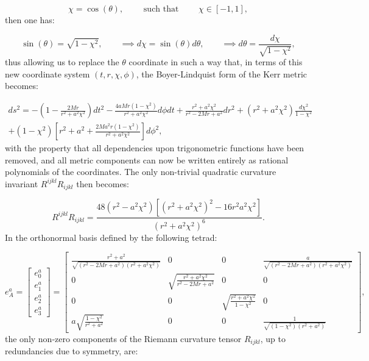 \documentclass{article}
\begin{document}
\begin{equation}
\chi = \cos \left( \theta \right), \qquad \text{ such that } \qquad \chi \in \left[ -1, 1 \right],
\end{equation}
then one has:

\begin{equation}
\sin \left( \theta \right) = \sqrt{1 - \chi^2}, \qquad \implies d \chi = \sin \left( \theta \right) d \theta, \qquad \implies d \theta = \frac{d \chi}{\sqrt{1 - \chi^2}},
\end{equation}
thus allowing us to replace the ${\theta}$ coordinate in such a way that, in terms of this new coordinate system ${\left( t, r, \chi, \phi \right)}$, the Boyer-Lindquist form of the Kerr metric becomes:

\begin{multline}
ds^2 = - \left( 1 - \frac{2 M r}{r^2 + a^2 \chi^2} \right) dt^2 - \frac{4 a M r \left( 1 - \chi^2 \right)}{r^2 + a^2 \chi^2} d \phi dt + \frac{r^2 + a^2 \chi^2}{r^2 - 2 M r + a^2} dr^2 + \left( r^2 + a^2 \chi^2 \right) \frac{d \chi^2}{1 - \chi^2}\\
+ \left( 1 - \chi^2 \right) \left[ r^2 + a^2 + \frac{2 M a^2 r \left( 1 - \chi^2 \right)}{r^2 + a^2 \chi^2} \right] d \phi^2,
\end{multline}
with the property that all dependencies upon trigonometric functions have been removed, and all metric components can now be written entirely as rational polynomials of the coordinates. The only non-trivial quadratic curvature invariant ${R^{i j k l} R_{i j k l}}$ then becomes:

\begin{equation}
R^{i j k l} R_{i j k l} = \frac{48 \left( r^2 - a^2 \chi^2 \right) \left[ \left( r^2 + a^2 \chi^2 \right)^2 - 16 r^2 a^2 \chi^2 \right]}{\left( r^2 + a^2 \chi^2 \right)^6}.
\end{equation}
In the orthonormal basis defined by the following tetrad:

\begin{equation}
e_{A}^{a} = \begin{bmatrix}
e_{0}^{a}\\
e_{1}^{a}\\
e_{2}^{a}\\
e_{3}^{a}
\end{bmatrix} = \begin{bmatrix}
\frac{r^2 + a^2}{\sqrt{\left( r^2 - 2 M r + a^2 \right) \left( r^2 + a^2 \chi^2 \right)}} & 0 & 0 & \frac{a}{\sqrt{\left( r^2 - 2 M r + a^2 \right) \left( r^2 + a^2 \chi^2 \right)}}\\
0 & \sqrt{\frac{r^2 + a^2 \chi^2}{r^2 - 2 M r + a^2}} & 0 & 0\\
0 & 0 & \sqrt{\frac{r^2 + a^2 \chi^2}{1 - \chi^2}} & 0\\
a \sqrt{\frac{1 - \chi^2}{r^2 + a^2}} & 0 & 0 & \frac{1}{\sqrt{\left( 1 - \chi^2 \right) \left( r^2 + a^2 \right)}}
\end{bmatrix},
\end{equation}
the only non-zero components of the Riemann curvature tensor ${R_{i j k l}}$, up to redundancies due to symmetry, are:
\end{document}
